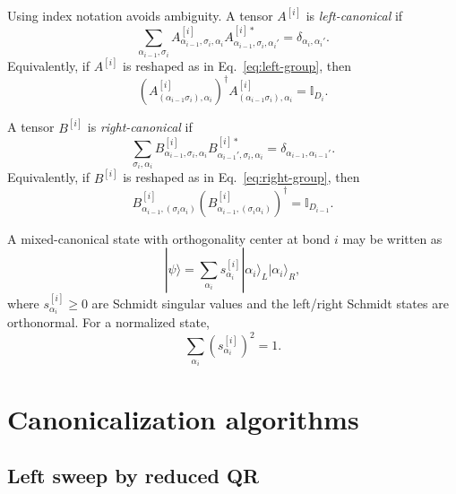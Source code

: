 \documentclass[aps,prb,onecolumn,nofootinbib]{revtex4-2}
\newcommand{\ket}[1]{|#1\rangle}
\newcommand{\Id}{\mathbb{I}}
\begin{document}
	Using index notation avoids ambiguity. A tensor $A^{[i]}$ is \emph{left-canonical} if
	\begin{equation}
		\sum_{\alpha_{i-1},\sigma_i}
		A^{[i]}_{\alpha_{i-1},\sigma_i,\alpha_i}
		A^{[i]*}_{\alpha_{i-1},\sigma_i,\alpha_i'}
		=
		\delta_{\alpha_i,\alpha_i'}.
		\label{eq:left-canonical}
	\end{equation}
	Equivalently, if $A^{[i]}$ is reshaped as in Eq.~\eqref{eq:left-group}, then
	\begin{equation}
		\left(A^{[i]}_{(\alpha_{i-1}\sigma_i),\alpha_i}\right)^\dagger
		A^{[i]}_{(\alpha_{i-1}\sigma_i),\alpha_i}
		= \Id_{D_i}.
	\end{equation}
	
	A tensor $B^{[i]}$ is \emph{right-canonical} if
	\begin{equation}
		\sum_{\sigma_i,\alpha_i}
		B^{[i]}_{\alpha_{i-1},\sigma_i,\alpha_i}
		B^{[i]*}_{\alpha_{i-1}',\sigma_i,\alpha_i}
		=
		\delta_{\alpha_{i-1},\alpha_{i-1}'}.
		\label{eq:right-canonical}
	\end{equation}
	Equivalently, if $B^{[i]}$ is reshaped as in Eq.~\eqref{eq:right-group}, then
	\begin{equation}
		B^{[i]}_{\alpha_{i-1},(\sigma_i\alpha_i)}
		\left(B^{[i]}_{\alpha_{i-1},(\sigma_i\alpha_i)}\right)^\dagger
		= \Id_{D_{i-1}}.
	\end{equation}
	
	A mixed-canonical state with orthogonality center at bond $i$ may be written as
	\begin{equation}
		\ket{\psi} =
		\sum_{\alpha_i}
		s^{[i]}_{\alpha_i}
		\ket{\alpha_i}_L \ket{\alpha_i}_R,
	\end{equation}
	where $s^{[i]}_{\alpha_i}\ge 0$ are Schmidt singular values and the left/right Schmidt states are orthonormal. For a normalized state,
	\[
	\sum_{\alpha_i} \left(s^{[i]}_{\alpha_i}\right)^2 = 1.
	\]
	
	\section{Canonicalization algorithms}
	
	\subsection{Left sweep by reduced QR}
	
\end{document}
